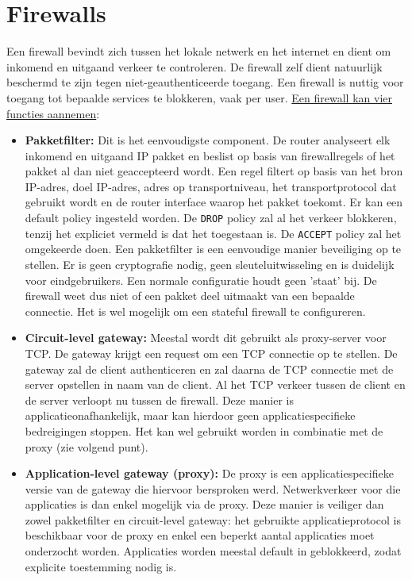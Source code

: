 \documentclass{report}
\begin{document}
	\section{Firewalls}
	Een firewall bevindt zich tussen het lokale netwerk en het internet en dient om inkomend en uitgaand verkeer te controleren. De firewall zelf dient natuurlijk beschermd te zijn tegen niet-geauthenticeerde toegang. Een firewall is nuttig voor toegang tot bepaalde services te blokkeren, vaak per user. \underline{Een firewall kan vier functies aannemen}:
	\begin{itemize}
		\item[\info] \textbf{Pakketfilter:} Dit is het eenvoudigste component. De router analyseert elk inkomend en uitgaand IP pakket en beslist op basis van firewallregels of het pakket al dan niet geaccepteerd wordt. Een regel filtert op basis van het bron IP-adres, doel IP-adres, adres op transportniveau, het transportprotocol dat gebruikt wordt en de router interface waarop het pakket toekomt. Er kan een default policy ingesteld worden. De \texttt{DROP} policy zal al het verkeer blokkeren, tenzij het expliciet vermeld is dat het toegestaan is. De \texttt{ACCEPT} policy zal het omgekeerde doen.  Een pakketfilter is een eenvoudige manier beveiliging op te stellen. Er is geen cryptografie nodig, geen sleuteluitwisseling en is duidelijk voor eindgebruikers. Een normale configuratie houdt geen 'staat' bij. De firewall weet dus niet of een pakket deel uitmaakt van een bepaalde connectie. Het is wel mogelijk om een stateful firewall te configureren. 
		\item[\info] \textbf{Circuit-level gateway:} Meestal wordt dit gebruikt als proxy-server voor TCP. De gateway krijgt een request om een TCP connectie op te stellen. De gateway zal de client authenticeren en zal daarna de TCP connectie met de server opstellen in naam van de client. Al het TCP verkeer tussen de client en de server verloopt nu tussen de firewall. Deze manier is applicatieonafhankelijk, maar kan hierdoor geen applicatiespecifieke bedreigingen stoppen. Het kan wel gebruikt worden in combinatie met de proxy (zie volgend punt).
		\item[\info] \textbf{Application-level gateway (proxy):} De proxy is een applicatiespecifieke versie van de gateway die hiervoor bersproken werd. Netwerkverkeer voor die applicaties is dan enkel mogelijk via de proxy. Deze manier is veiliger dan zowel pakketfilter en circuit-level gateway: het gebruikte applicatieprotocol is beschikbaar voor de proxy en enkel een beperkt aantal applicaties moet onderzocht worden. Applicaties worden meestal default in geblokkeerd, zodat explicite toestemming nodig is. 

\end{itemize}
\end{document}
